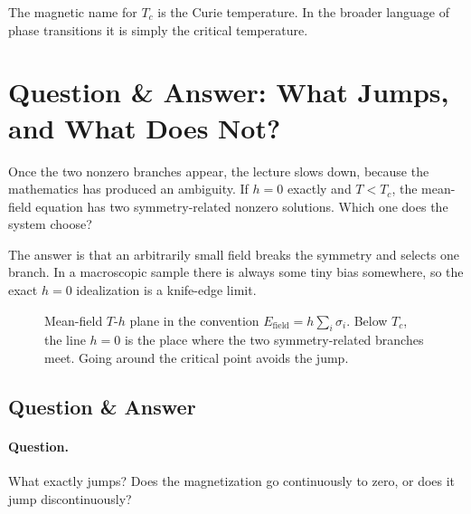 The magnetic name for \(T_c\) is the Curie temperature. In the broader language of phase transitions it is simply the critical temperature.

\section{Question \& Answer: What Jumps, and What Does Not?}

Once the two nonzero branches appear, the lecture slows down, because the mathematics has produced an ambiguity. If \(h=0\) exactly and \(T<T_c\), the mean-field equation has two symmetry-related nonzero solutions. Which one does the system choose?

The answer is that an arbitrarily small field breaks the symmetry and selects one branch. In a macroscopic sample there is always some tiny bias somewhere, so the exact \(h=0\) idealization is a knife-edge limit.

\begin{figure}[h]
\centering
{}
\caption{Mean-field \(T\)-\(h\) plane in the convention \(E_{\text{field}}=h\sum_i \sigma_i\). Below \(T_c\), the line \(h=0\) is the place where the two symmetry-related branches meet. Going around the critical point avoids the jump.}
\end{figure}

\subsection{Question \& Answer}

\paragraph{Question.} What exactly jumps? Does the magnetization go continuously to zero, or does it jump discontinuously?

